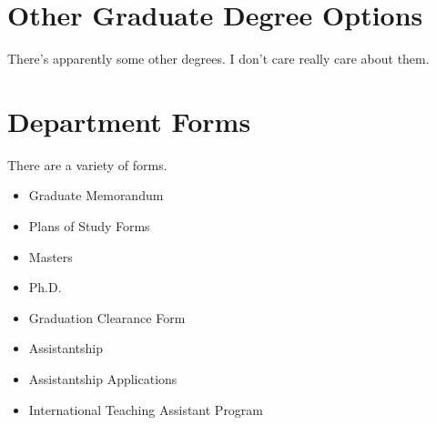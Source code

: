 \section{Other Graduate Degree Options}
There's apparently some other degrees. I don't care really care about them.

\section{Department Forms}
There are a variety of forms.
\begin{itemize}
    \item Graduate Memorandum
    \item Plans of Study Forms
    \item Masters
    \item Ph.D.
    \item Graduation Clearance Form
    \item Assistantship
    \item Assistantship Applications
    \item International Teaching Assistant Program
\end{itemize}
